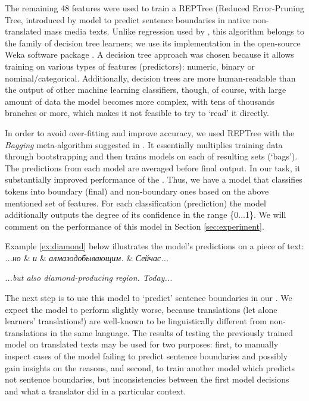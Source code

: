 \documentclass[output=paper]{langsci/langscibook.cls}
\begin{document}
The remaining 48 features were used to train a REPTree (Reduced Error-Pruning Tree, introduced by \citet{Quinlan:1987} model to predict sentence boundaries in native non-translated mass media texts. Unlike regression used by \citet{Gries:2014}, this algorithm belongs to the family of decision tree learners; we use its implementation in the open-source Weka software package \citet{Hall:2009}. A decision tree approach was chosen because it allows training on various types of features (predictors): numeric, binary or nominal/categorical. Additionally, decision trees are more human-readable than the output of other machine learning classifiers, though, of course, with large amount of data the model becomes more complex, with tens of thousands branches or more, which makes it not feasible to try to `read' it directly. 

In order to avoid over-fitting and improve accuracy, we used REPTree with the \textit{Bagging} meta-algorithm suggested in \citet{Breiman:1996}. It essentially multiplies training data through bootstrapping and then trains models on each of resulting sets (`bags'). The predictions from each model are averaged before final output. In our task, it substantially improved performance of the . Thus, we have a model that classifies tokens into boundary (final) and non-boundary ones based on the above mentioned set of features. For each classification (prediction) the model additionally outputs the degree of its confidence in the range \{0...1\}.  We will comment on the performance of this model in Section \ref{sec:experiment}.

Example \ref{ex:diamond} below illustrates the model's predictions on a piece of  text: \\

\ea
\label{ex:diamond}
    \textit{...но} \&  \textit{и} \&  \textit{алмазодобывающим.} \& \textit{Сейчас...}

\textit{...but also diamond-producing region. Today...}
\z

The next step is to use this model to `predict' sentence boundaries in our . We expect the model to perform slightly worse, because translations (let alone learners' translations!) are well-known to be linguistically different from non-translations in the same language. The results of testing the previously trained model on translated texts may be used for two purposes: first, to manually inspect cases of the model failing to predict sentence boundaries and possibly gain insights on the reasons, and second, to train another model which predicts not sentence boundaries, but inconsistencies between the first model decisions and what a translator did in a particular context. 
\end{document}
